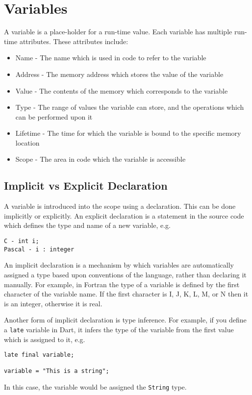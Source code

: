 
\section*{Variables}

A variable is a place-holder for a run-time value. Each variable has multiple run-time attributes. These attributes
 include:
\begin{itemize}
  \item Name - The name which is used in code to refer to the variable
  \item Address - The memory address which stores the value of the variable
  \item Value - The contents of the memory which corresponds to the variable
  \item Type - The range of values the variable can store, and the operations which can be performed upon it
  \item Lifetime - The time for which the variable is bound to the specific memory location
  \item Scope - The area in code which the variable is accessible
\end{itemize}

\subsection*{Implicit vs Explicit Declaration}

A variable is introduced into the scope using a declaration. This can be done implicitly or explicitly. An explicit
 declaration is a statement in the source code which defines the type and name of a new variable, e.g.
\begin{verbatim}
C - int i;
Pascal - i : integer
\end{verbatim}

An implicit declaration is a mechanism by which variables are automatically assigned a type based upon conventions of
 the language, rather than declaring it manually. For example, in Fortran the type of a variable is defined by the first
 character of the variable name. If the first character is I, J, K, L, M, or N then it is an integer, otherwise it is
 real.
 
Another form of implicit declaration is type inference. For example, if you define a \verb`late` variable in Dart, it
 infers the type of the variable from the first value which is assigned to it, e.g.
\begin{verbatim}
late final variable;

variable = "This is a string";
\end{verbatim}
In this case, the variable would be assigned the \verb`String` type.


